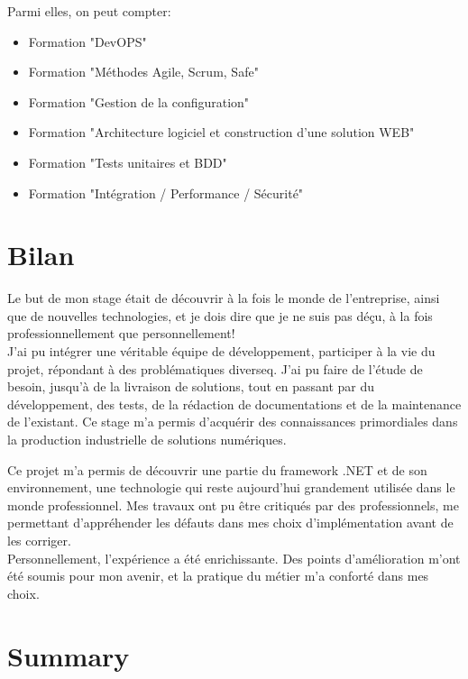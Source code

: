 \documentclass{rapport}
\begin{document}
Parmi elles, on peut compter:
\begin{itemize}
    \item Formation "DevOPS"
    \item Formation "Méthodes Agile, Scrum, Safe"
    \item Formation "Gestion de la configuration"
    \item Formation "Architecture logiciel et construction d’une solution WEB"
    \item Formation "Tests unitaires et BDD"
    \item Formation "Intégration / Performance / Sécurité"
\end{itemize}


\newpage
\section{Bilan}

Le but de mon stage était de découvrir à la fois le monde de l'entreprise, ainsi que de nouvelles technologies, et je dois dire que je ne suis pas déçu, à la fois professionnellement que personnellement!\\

J'ai pu intégrer une véritable équipe de développement, participer à la vie du projet, répondant à des problématiques diverseq. J'ai pu faire de l'étude de besoin, jusqu'à de la livraison de solutions, tout en passant par du développement, des tests, de la rédaction de documentations et de la maintenance de l'existant. Ce stage m'a permis d'acquérir des connaissances primordiales dans la production industrielle de solutions numériques.

Ce projet m'a permis de découvrir une partie du framework .NET et de son environnement, une technologie qui reste aujourd'hui grandement utilisée dans le monde professionnel.
Mes travaux ont pu être critiqués par des professionnels, me permettant d'appréhender les défauts dans mes choix d'implémentation avant de les corriger. \\

Personnellement, l'expérience a été enrichissante. Des points d'amélioration m'ont été soumis pour mon avenir, et la pratique du métier m'a conforté dans mes choix.

\section*{Summary}
\end{document}
